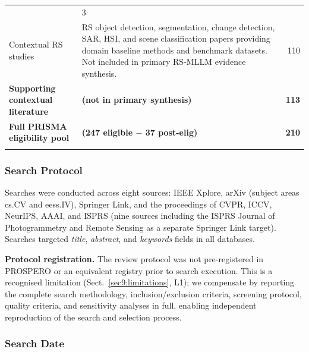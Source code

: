 \begin{table}[h]
\begin{tabular*}{\textwidth}{@{\extracolsep\fill}p{3.8cm}p{6.8cm}r}
  & 3 \\
Contextual RS studies
  & RS object detection, segmentation, change detection, SAR, HSI, and scene
    classification papers providing domain baseline methods and benchmark datasets.
    Not included in primary RS-MLLM evidence synthesis.
  & 110 \\
\midrule
\textbf{Supporting contextual literature} & \textbf{(not in primary synthesis)} & \textbf{113} \\
\midrule
\textbf{Full PRISMA eligibility pool} & \textbf{(247 eligible $-$ 37 post-elig)} & \textbf{210} \\
\botrule
\end{tabular*}
\end{table}

\subsubsection{Search Protocol}\label{sec2:search}

Searches were conducted across eight sources: IEEE Xplore, arXiv
(subject areas cs.CV and eess.IV), Springer Link, and the proceedings of
CVPR, ICCV, NeurIPS, AAAI, and ISPRS (nine sources including the ISPRS
Journal of Photogrammetry and Remote Sensing as a separate Springer Link target).
Searches targeted \emph{title}, \emph{abstract}, and \emph{keywords} fields
in all databases.

\textbf{Protocol registration.} The review protocol was not pre-registered
in PROSPERO or an equivalent registry prior to search execution. This is a
recognised limitation (Sect.~\ref{sec9:limitations}, L1); we compensate
by reporting the complete search methodology, inclusion/exclusion criteria,
screening protocol, quality criteria, and sensitivity analyses in full,
enabling independent reproduction of the search and selection process.

\subsubsection{Search Date}\label{sec2:searchdate}

